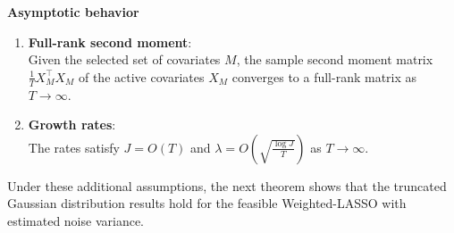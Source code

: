 \documentclass[11pt]{article}
\def\cmt#1{{\textcolor{red}{(#1)}}}
\begin{document}

\begin{assumption_app}\label{asu_gram} {\bf Asymptotic behavior}
	\vspace{-0.1cm}
	\begin{enumerate}[label=(\alph*)]
		\item {\bf  Full-rank second moment}:\\
	 Given the selected set of covariates $M$, the sample second moment matrix $\frac{1}{T} X_M^\top X_M $ of the active covariates $X_M$ converges to a full-rank matrix as $T \rightarrow \infty$.
		\item {\bf Growth rates}:\\
The rates satisfy $J=O(T)$ and $\lambda=O \left (\sqrt{\frac{\log J}{T}} \right)$ as $T\to\infty$.
	\end{enumerate}
\end{assumption_app}
Under these additional assumptions, the next theorem shows that the truncated Gaussian distribution results hold for the feasible Weighted-LASSO with estimated noise variance.


\end{document}
